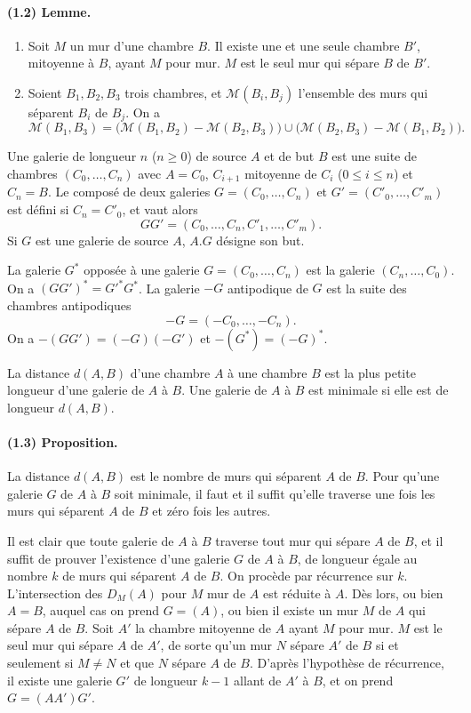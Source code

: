 \documentclass[10pt,a4paper]{article}
\newcommand{\mcM}{\mathcal M}
\begin{document}
\paragraph{(1.2) Lemme.} \begin{enumerate}[label=(\roman*)]
\item Soit $M$ un mur d'une chambre $B$. Il existe une et une seule chambre $B'$, mitoyenne à $B$, ayant $M$ pour mur. $M$ est le seul mur qui sépare $B$ de $B'$.
\item Soient $B_1,B_2,B_3$ trois chambres, et $\mcM(B_i,B_j)$ l'ensemble des murs qui séparent $B_i$ de $B_j$. On a
\[
\mcM(B_1,B_3)=\bigl(\mcM(B_1,B_2)-\mcM(B_2,B_3)\bigr)\cup
\bigl(\mcM(B_2,B_3)-\mcM(B_1,B_2)\bigr).
\]
\end{enumerate}

Une galerie de longueur $n$ ($n\ge0$) de source $A$ et de but $B$ est une suite de chambres $(C_0,\ldots,C_n)$ avec $A=C_0$, $C_{i+1}$ mitoyenne de $C_i$ ($0\le i\le n$) et $C_n=B$. Le composé de deux galeries $G=(C_0,\ldots,C_n)$ et $G'=(C'_0,\ldots,C'_m)$ est défini si $C_n=C'_0$, et vaut alors
\[
GG'=(C_0,\ldots,C_n,C'_1,\ldots,C'_m).
\]
Si $G$ est une galerie de source $A$, $A.G$ désigne son but.

La galerie $G^*$ opposée à une galerie $G=(C_0,\ldots,C_n)$ est la galerie $(C_n,\ldots,C_0)$. On a $(GG')^*=G'^*G^*$. La galerie $-G$ antipodique de $G$ est la suite des chambres antipodiques
\[
-G=(-C_0,\ldots,-C_n).
\]
On a $-(GG')=(-G)(-G')$ et $-(G^*)=(-G)^*$.

La distance $d(A,B)$ d'une chambre $A$ à une chambre $B$ est la plus petite longueur d'une galerie de $A$ à $B$. Une galerie de $A$ à $B$ est minimale si elle est de longueur $d(A,B)$.

\paragraph{(1.3) Proposition.} La distance $d(A,B)$ est le nombre de murs qui séparent $A$ de $B$. Pour qu'une galerie $G$ de $A$ à $B$ soit minimale, il faut et il suffit qu'elle traverse une fois les murs qui séparent $A$ de $B$ et zéro fois les autres.

Il est clair que toute galerie de $A$ à $B$ traverse tout mur qui sépare $A$ de $B$, et il suffit de prouver l'existence d'une galerie $G$ de $A$ à $B$, de longueur égale au nombre $k$ de murs qui séparent $A$ de $B$. On procède par récurrence sur $k$. L'intersection des $D_M(A)$ pour $M$ mur de $A$ est réduite à $A$. Dès lors, ou bien $A=B$, auquel cas on prend $G=(A)$, ou bien il existe un mur $M$ de $A$ qui sépare $A$ de $B$. Soit $A'$ la chambre mitoyenne de $A$ ayant $M$ pour mur. $M$ est le seul mur qui sépare $A$ de $A'$, de sorte qu'un mur $N$ sépare $A'$ de $B$ si et seulement si $M\ne N$ et que $N$ sépare $A$ de $B$. D'après l'hypothèse de récurrence, il existe une galerie $G'$ de longueur $k-1$ allant de $A'$ à $B$, et on prend $G=(AA')G'$.
\end{document}
